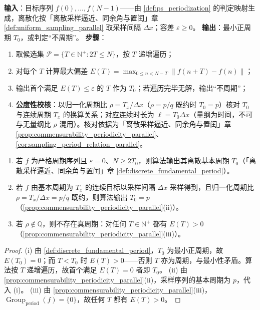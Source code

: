 \begin{definition}[最小正周期查找算法]\label{def:ps_minimal_period_algorithm}
\textbf{输入}：目标序列 $f(0),\dots,f(N-1)$——由 \cref{def:ps_periodization} 的判定映射生成，离散化按「离散采样逼近、同余角与置闰」章 \cref{def:uniform_sampling_parallel} 取采样间隔 $\Delta x$；容差 $\varepsilon\ge0$。
\textbf{输出}：最小正周期 $T_0$，或判定“不周期”。
\textbf{步骤}：
\begin{enumerate}[label=(\arabic*)]
    \item 取候选集 $\mathcal{P}=\{T\in\mathbb{N}^+:2T\le N\}$，按 $T$ 递增遍历；
    \item 对每个 $T$ 计算最大偏差 $E(T)=\max_{0\le n<N-T}\|f(n+T)-f(n)\|$；
    \item 输出首个满足 $E(T)\le\varepsilon$ 的 $T$ 作为 $T_0$；若遍历完毕无解，输出“不周期”；
    \item \textbf{公度性校核}：以归一化周期比 $\rho=T_x/\Delta x$（$\rho=p/q$ 既约时 $T_0=p$）核对 $T_0$ 与连续周期 $T_x$ 的换算关系；对应连续时长为 $\ell=T_0\Delta x$（量纲为时间，不可与无量纲比 $\rho$ 混用）。核对依据为「离散采样逼近、同余角与置闰」章 \cref{prop:commensurability_periodicity_parallel}、\cref{cor:sampling_period_relation_parallel}。
\end{enumerate}
\end{definition}

\begin{theorem}[最小正周期算法的正确性]\label{thm:ps_minimal_period_correctness}
\begin{enumerate}[label=(\roman*)]
    \item 若 $f$ 为严格周期序列且 $\varepsilon=0$、$N\ge2T_0$，则算法输出其离散基本周期 $T_0$（「离散采样逼近、同余角与置闰」章 \cref{def:discrete_fundamental_period}）。
    \item 若 $f$ 由基本周期为 $T_x$ 的连续目标以采样间隔 $\Delta x$ 采样得到，且归一化周期比 $\rho=T_x/\Delta x=p/q$ 既约，则算法输出 $T_0=p$（\cref{prop:commensurability_periodicity_parallel}(ii)）。
    \item 若 $\rho\notin\mathbb{Q}$，则不存在真周期：对任何 $T\in\mathbb{N}^+$ 都有 $E(T)>0$（\cref{prop:commensurability_periodicity_parallel}(iii)）。
\end{enumerate}
\end{theorem}

\begin{proof}
(i) 由 \cref{def:discrete_fundamental_period}，$T_0$ 为最小正周期，故 $E(T_0)=0$；而 $T<T_0$ 时 $E(T)>0$——否则 $T$ 亦为周期，与最小性矛盾。算法按 $T$ 递增遍历，故首个满足 $E(T)=0$ 者即 $T_0$。
(ii) 由 \cref{prop:commensurability_periodicity_parallel}(ii)，采样序列的基本周期为 $p$，代入 (i)。
(iii) 由 \cref{prop:commensurability_periodicity_parallel}(iii)，$\operatorname{Group}_{\mathrm{period}}(f)=\{0\}$，故任何 $T$ 都有 $E(T)>0$。
\end{proof}

